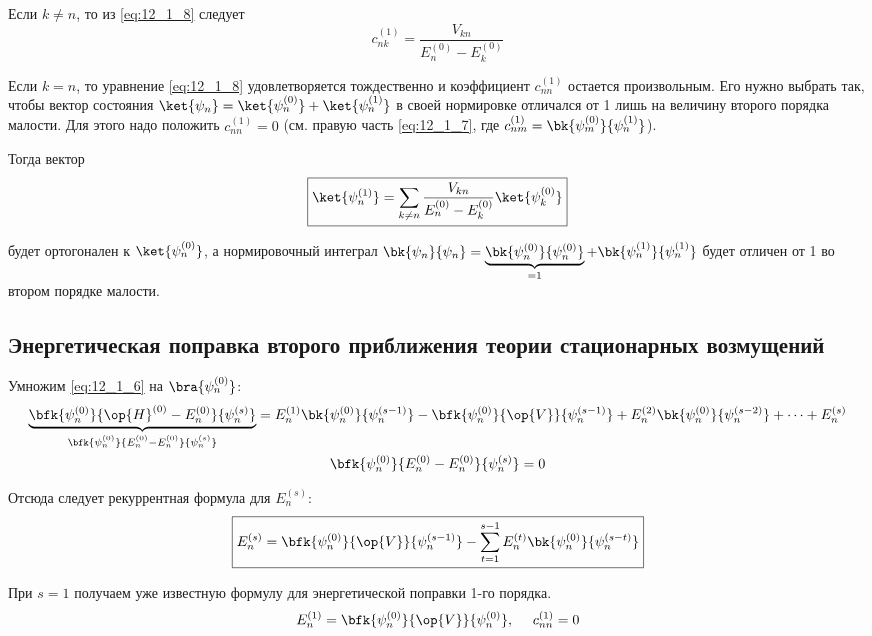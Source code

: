 Если $k \neq n$, то из \eqref{eq:12_1_8} следует
\begin{equation}
\label{eq:12_1_9}
c_{nk}^{(1)} = \frac{V_{kn}}{E_n^{(0)} - E_k^{(0)}}
\end{equation}

Если $k = n$, то уравнение \eqref{eq:12_1_8} удовлетворяется тождественно и коэффициент $c_{nn}^{(1)}$ остается произвольным. Его нужно выбрать так, чтобы вектор состояния $\ket{\psi_n} = \ket{\psi_n^{(0)}} + \ket{\psi_n^{(1)}}$ в своей нормировке отличался от 1 лишь на величину второго порядка малости. Для этого надо положить $c_{nn}^{(1)} = 0$ (см. правую часть \eqref{eq:12_1_7}, где $c_{nm}^{(1)} = \bk{\psi_m^{(0)}}{\psi_n^{(1)}}$).

Тогда вектор
\begin{equation}
\label{eq:12_1_10}
\boxed{\ket{\psi_n^{(1)}}= \sum_{k \neq n} \frac{V_{kn}}{E_n^{(0)} - E_k^{(0)}} \ket{\psi_k^{(0)}}}
\end{equation}

будет ортогонален к $\ket{\psi_n^{(0)}}$, а нормировочный интеграл $\bk{\psi_n}{\psi_n} = \underbrace{\bk{\psi_n^{(0)}}{\psi_n^{(0)}}}_{=1} + \bk{\psi_n^{(1)}}{\psi_n^{(1)}}$ будет отличен от 1 во втором порядке малости.

\subsection{Энергетическая поправка второго приближения теории стационарных возмущений}

Умножим \eqref{eq:12_1_6} на $\bra{\psi_n^{(0)}}$:
\begin{gather*}
\underbrace{\bfk{\psi_n^{(0)}}{\op{H}^{(0)} - E_n^{(0)}} {\psi_n^{(s)}}}_{\bfk{\psi_n^{(0)}}{E_n^{(0)} - E_n^{(0)}}{\psi_n^{(s)}}} = E_n^{(1)} \bk{\psi_n^{(0)}}{\psi_n^{(s-1)}} - \bfk{\psi_n^{(0)}}{\op{V}}{\psi_n^{(s-1)}} + E_n^{(2)}\bk{\psi_n^{(0)}}{\psi_n^{(s-2)}}+\dots+E_n^{(s)}\\
\bfk{\psi_n^{(0)}}{E_n^{(0)} - E_n^{(0)}}{\psi_n^{(s)}} = 0
\end{gather*}

Отсюда следует рекуррентная формула для $E_n^{(s)}$:
$$
\boxed{E_n^{(s)} = \bfk{\psi_n^{(0)}}{\op{V}}{\psi_n^{(s-1)}} - \sum_{t=1}^{s-1} E_n^{(t)} \bk{\psi_n^{(0)}}{\psi_n^{(s-t)}}}
$$

При $s=1$ получаем уже известную формулу для энергетической поправки 1-го порядка.
$$
E_n^{(1)} = \bfk{\psi_n^{(0)}}{\op{V}}{\psi_n^{(0)}}, ~~~~c_{nn}^{(1)} = 0
$$

